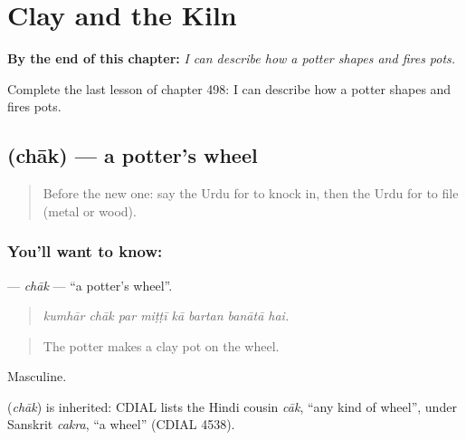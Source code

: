 
\chapter{Clay and the Kiln}
\label{ch:ur-clay-and-the-kiln}

\begin{chapteropening}
\textbf{By the end of this chapter:} \emph{I can describe how a potter shapes and fires pots.}

Complete the last lesson of chapter 498: I can describe how a potter shapes and fires pots.
\end{chapteropening}

\section[\texorpdfstring{\ur{چاک} (chāk)}{چاک (chāk)}]{ (chāk) — a potter's wheel}

\label{lesson:UR-C498-chak}



\begin{quote}
Before the new one: say the Urdu for to knock in, then the Urdu for to file (metal or wood).
\end{quote}

\subsection*{You'll want to know: }
\textbf{} — \emph{chāk} — \textquotedblleft{}a potter's wheel\textquotedblright{}.

\begin{quote}
       
\end{quote}

\begin{quote}
\emph{kumhār chāk par miṭṭī kā bartan banātā hai.}
\end{quote}

\begin{quote}
The potter makes a clay pot on the wheel.
\end{quote}

Masculine.

\begin{cousinweb}
\textbf{} (\emph{chāk}) is inherited: CDIAL lists the Hindi cousin \emph{cāk}, \textquotedblleft{}any kind of wheel\textquotedblright{}, under Sanskrit \emph{cakra}, \textquotedblleft{}a wheel\textquotedblright{} (CDIAL 4538).
\end{cousinweb}

